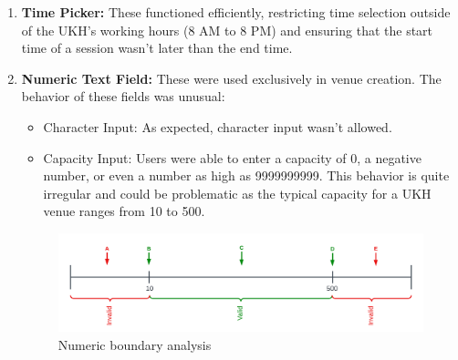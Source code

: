 \begin{justify}
\begin{enumerate}
        \vspace{2cm}

        \item \textbf{Time Picker:} These functioned efficiently, restricting time selection outside of the UKH's working hours (8 AM to 8 PM) and ensuring that the start time of a session wasn't later than the end time.

        \item \textbf{Numeric Text Field:} These were used exclusively in venue creation. The behavior of these fields was unusual:

        \begin{itemize}
            \item Character Input: As expected, character input wasn't allowed.
            \item Capacity Input: Users were able to enter a capacity of 0, a negative number, or even a number as high as 9999999999. This behavior is quite irregular and could be problematic as the typical capacity for a UKH venue ranges from 10 to 500.\\
        \end{itemize}

            \begin{figure}[H]
                \centerline{\includegraphics[width=150mm,scale=1]{figures/implementation_and_testing/testing/BAT/boundary (5).png}}
                \caption{Numeric boundary analysis}
                \label{Numeric_boundary_analysis}
            \end{figure}


\end{enumerate}
\end{justify}
